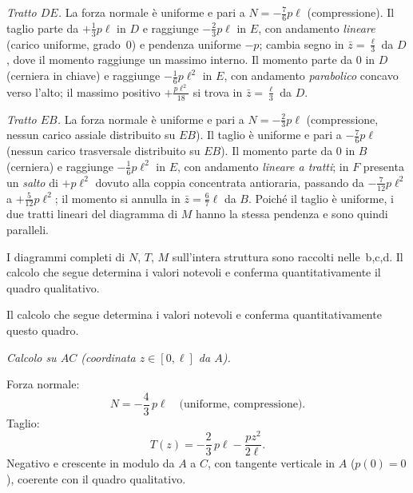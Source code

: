 \medskip
\noindent\textit{Tratto $DE$.}
La forza normale è uniforme e pari a
$N = -\tfrac{7}{6}p\ell$ (compressione).
Il taglio parte da $+\tfrac{1}{3}p\ell$ in $D$
e raggiunge $-\tfrac{2}{3}p\ell$ in $E$,
con andamento \emph{lineare} (carico uniforme, grado~0)
e pendenza uniforme $-p$; cambia segno in
$\bar{z} = \tfrac{\ell}{3}$ da $D$,
dove il momento raggiunge un massimo interno.
Il momento parte da $0$ in $D$ (cerniera in chiave)
e raggiunge $-\tfrac{1}{6}p\ell^2$ in $E$,
con andamento \emph{parabolico} concavo verso l'alto;
il massimo positivo $+\tfrac{p\ell^2}{18}$ si trova
in $\bar{z} = \tfrac{\ell}{3}$ da $D$.

\medskip
\noindent\textit{Tratto $EB$.}
La forza normale è uniforme e pari a
$N = -\tfrac{2}{3}p\ell$ (compressione, nessun carico
assiale distribuito su $EB$).
Il taglio è uniforme e pari a $-\tfrac{7}{6}p\ell$
(nessun carico trasversale distribuito su $EB$).
Il momento parte da $0$ in $B$ (cerniera)
e raggiunge $-\tfrac{1}{6}p\ell^2$ in $E$,
con andamento \emph{lineare a tratti}; in $F$
presenta un \emph{salto} di $+p\ell^2$ dovuto
alla coppia concentrata antioraria, passando
da $-\tfrac{7}{12}p\ell^2$ a $+\tfrac{5}{12}p\ell^2$;
il momento si annulla in $\bar{z} = \tfrac{6}{7}\ell$
da $B$. Poiché il taglio è uniforme, i due tratti
lineari del diagramma di $M$ hanno la stessa pendenza
e sono quindi paralleli.

I diagrammi completi di $N$, $T$, $M$ sull'intera
struttura sono raccolti nelle \,b,c,d.
Il calcolo che segue determina i valori notevoli
e conferma quantitativamente il quadro qualitativo.







\medskip
Il calcolo che segue determina i valori notevoli
e conferma quantitativamente questo quadro.

\medskip
\noindent\textit{Calcolo su $AC$
(coordinata $z \in [0,\ell]$ da $A$).}

\noindent Forza normale:
\[
N = -\frac{4}{3}\,p\ell
\quad\text{(uniforme, compressione).}
\]
Taglio:
\[
T(z) = -\frac{2}{3}\,p\ell - \frac{pz^2}{2\ell}.
\]
Negativo e crescente in modulo da $A$ a $C$,
con tangente verticale in $A$ ($p(0)=0$),
coerente con il quadro qualitativo.

